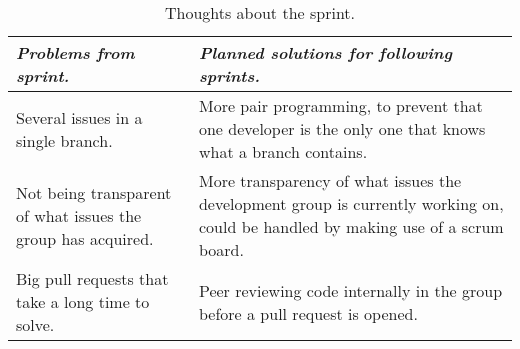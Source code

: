 \begin{table}[ht]
\begin{tabularx}{0.9\textwidth}{X|X}
\textit{Problems from sprint.} & \textit{Planned solutions for following sprints.} \\\hline
Several issues in a single branch. &  More pair programming, to prevent that one developer is the only one that knows what a branch contains. \\ \hline
Not being transparent of what issues the group has acquired. & More transparency of what issues the development group is currently working on, could be handled by making use of a scrum board. \\\hline
Big pull requests that take a long time to solve. & Peer reviewing code internally in the group before a pull request is opened. \\\hline
\end{tabularx}
\caption{Thoughts about the sprint.}
\label{table:ourRetrospectiveIdeasSprint2}
\end{table}

